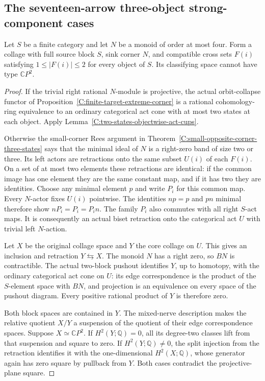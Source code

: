\subsection{The seventeen-arrow three-object strong-component cases}

\begin{lemma}\label{C:small-corner-two-states-per-object}
Let $S$ be a finite category and let $N$ be a monoid of order
at most four. Form a collage with full source block $S$, sink
corner $N$, and compatible cross sets $F(i)$ satisfying
$1\leq|F(i)|\leq2$ for every object of $S$. Its classifying
space cannot have type $\mathbb CP^2$.
\end{lemma}
\begin{proof}
If the trivial right rational $N$-module is projective, the
actual orbit-collapse functor of
Proposition~\ref{C:finite-target-extreme-corner} is a rational
cohomology-ring equivalence to an ordinary categorical act cone
with at most two states at each object. Apply
Lemma~\ref{C:two-states-objectwise-act-cups}.

Otherwise the small-corner Rees argument in
Theorem~\ref{C:small-opposite-corner-three-states} says that the
minimal ideal of $N$ is a right-zero band of size two or three.
Its left actors are retractions onto the same subset $U(i)$ of
each $F(i)$. On a set of at most two elements these retractions
are identical: if the common image has one element they are
the same constant map, and if it has two they are identities.
Choose any minimal element $p$ and write $P_i$ for this common
map. Every $N$-actor fixes $U(i)$ pointwise. The identities
$np=p$ and $pn$ minimal therefore show
$nP_i=P_i=P_in$. The family $P_i$ also commutes with all
right $S$-act maps. It is consequently an actual biset retraction
onto the categorical act $U$ with trivial left $N$-action.

Let $X$ be the original collage space and $Y$ the core collage
on $U$. This gives an inclusion and retraction $Y\leftrightarrows X$.
The monoid $N$ has a right zero, so $BN$ is contractible. The
actual two-block pushout identifies $Y$, up to homotopy, with
the ordinary categorical act cone on $U$: its edge correspondence
is the product of the $S$-element space with $BN$, and projection
is an equivalence on every space of the pushout diagram.
Every positive rational product of $Y$ is therefore zero.

Both block spaces are contained in $Y$. The mixed-nerve
description makes the relative quotient $X/Y$ a suspension of
the quotient of their edge correspondence spaces. Suppose
$X\simeq\mathbb CP^2$. If $H^2(Y;\mathbb Q)=0$, all its
degree-two classes lift from that suspension and square to zero.
If $H^2(Y;\mathbb Q)\ne0$, the split injection from the
retraction identifies it with the one-dimensional $H^2(X;\mathbb Q)$,
whose generator again has zero square by pullback from $Y$.
Both cases contradict the projective-plane square.
\end{proof}

